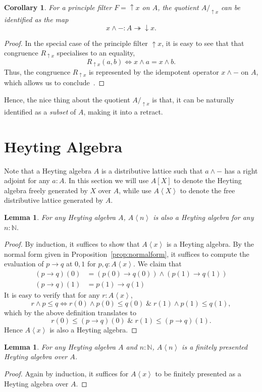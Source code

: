 \documentclass[12pt]{amsart}
\newtheorem{lemma}[theorem]{Lemma}
\newtheorem{corollary}[theorem]{Corollary}
\theoremstyle{definition}
\newcommand{\mbb}[1]{\mathbb{#1}}
\newcommand{\eff}{\Leftrightarrow}
\newcommand{\conjt}{\;\&\;}
\newcommand{\pair}[1]{\left\langle#1\right\rangle}
\newcommand{\surj}{\twoheadrightarrow}
\newcommand{\dv}{\operatorname{\uparrow}}
\newcommand{\cv}{\operatorname{\downarrow}}
\newcommand{\N}{\mbb N}
\newcommand{\dsg}[1]{\!\pair{#1}}
\begin{document}
\begin{corollary}
  For a principle filter $F = \dv x$ on $A$, the quotient $A/_{\dv x}$ can be identified as the map
  \[ x \wedge - : A \surj \cv x. \]
\end{corollary}
\begin{proof}
  In the special case of the principle filter $\dv x$, it is easy to see that that congruence $R_{\dv x}$ specialises to an equality, 
  \[ R_{\dv x}(a,b) \eff x \wedge a = x \wedge b. \]
  Thus, the congruence $R_{\dv x}$ is represented by the idempotent operator $x \wedge -$ on $A$, which allows us to conclude~\cite[Lem. 6.10.8]{hottbook}. 
\end{proof}

Hence, the nice thing about the quotient $A/_{\dv x}$ is that, it can be naturally identified as a \emph{subset} of $A$, making it into a retract.

\section{Heyting Algebra}

Note that a Heyting algebra $A$ is a distributive lattice such that $a \wedge -$ has a right adjoint for any $a : A$. In this section we will use $A[X]$ to denote the Heyting algebra freely generated by $X$ over $A$, while use $A\dsg X$ to denote the free distributive lattice generated by $A$.

\begin{lemma}
  For any Heyting algebra $A$, $A\dsg{n}$ is also a Heyting algebra for any $n:\N$.
\end{lemma}
\begin{proof}
  By induction, it suffices to show that $A\dsg x$ is a Heyting algebra. By the normal form given in Proposition~\ref{prop:normalform}, it suffices to compute the evaluation of $p \to q$ at $0,1$ for $p,q : A\dsg x$. We claim that
  \begin{align*}
    (p \to q)(0) &= (p(0) \to q(0)) \wedge (p(1) \to q(1)) \\
    (p \to q)(1) &= p(1) \to q(1)
  \end{align*}
  It is easy to verify that for any $r : A\dsg x$,
  \[ r \wedge p \le q \eff r(0) \wedge p(0) \le q(0) \conjt r(1) \wedge p(1) \le q(1), \]
  which by the above definition translates to
  \[ r(0) \le (p \to q)(0) \conjt r(1) \le (p \to q)(1). \]
  Hence $A\dsg x$ is also a Heyting algebra.
\end{proof}

\begin{lemma}
  For any Heyting algebra $A$ and $n:\N$, $A\dsg n$ is a finitely presented Heyting algebra over $A$.
\end{lemma}
\begin{proof}
  Again by induction, it suffices for $A\dsg x$ to be finitely presented as a Heyting algebra over $A$.
\end{proof}
\end{document}
